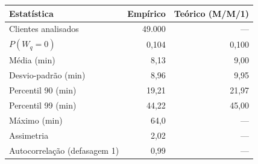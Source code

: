\begin{tabular}{lrr}
\toprule
Estatística & Empírico & Teórico (M/M/1) \\
\midrule
Clientes analisados & 49.000 & --- \\
$P(W_q=0)$ & 0,104 & 0,100 \\
Média (min) & 8,13 & 9,00 \\
Desvio-padrão (min) & 8,96 & 9,95 \\
Percentil 90 (min) & 19,21 & 21,97 \\
Percentil 99 (min) & 44,22 & 45,00 \\
Máximo (min) & 64,0 & --- \\
Assimetria & 2,02 & --- \\
Autocorrelação (defasagem 1) & 0,99 & --- \\
\bottomrule
\end{tabular}

